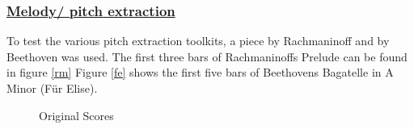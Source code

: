 \subsubsection{\underline{Melody/ pitch extraction}} \label{midiest}
To test the various pitch extraction toolkits, a piece by Rachmaninoff and by Beethoven was used. The first three bars of Rachmaninoffs Prelude can be found in figure \ref{rm}
Figure \ref{fe} shows the first five bars of Beethovens Bagatelle in A Minor (Für Elise).


\begin{figure}[htbp]
	\centering
	\caption{Original Scores}
	\label{fig:sheets}
\end{figure}

